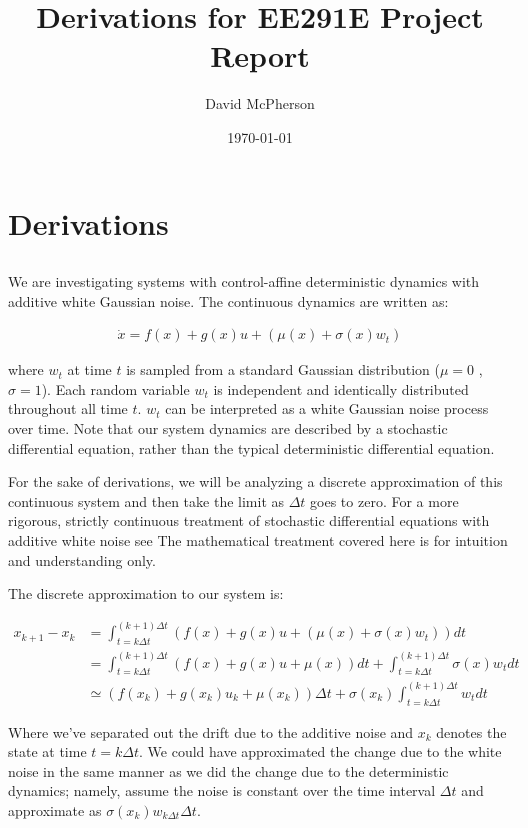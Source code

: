 \documentclass[a4paper]{article}
\title{Derivations for EE291E Project Report}
\author{David McPherson}
\date{\today}
\begin{document}
\section{Derivations}
\subsection{}
We are investigating systems with control-affine deterministic dynamics with additive white Gaussian noise.
The continuous dynamics are written as:

\begin{align}
\dot{x} = f(x) + g(x) u + (\mu(x) + \sigma(x) w_t)
\end{align}

where $w_t$ at time $t$ is sampled from a standard Gaussian distribution ($\mu = 0$ , $\sigma = 1$).
Each random variable $w_t$ is independent and identically distributed throughout all time $t$.
$w_t$ can be interpreted as a white Gaussian noise process over time.
Note that our system dynamics are described by a stochastic differential equation, rather than the typical deterministic differential equation.

For the sake of derivations, we will be analyzing a discrete approximation of this continuous system and then take the limit as $\Delta t$ goes to zero.
For a more rigorous, strictly continuous treatment of stochastic differential equations with additive white noise see %
The mathematical treatment covered here is for intuition and understanding only.

The discrete approximation to our system is:

\begin{align}
x_{k+1} - x_k &= \int_{t = k \Delta t}^{(k+1) \Delta t} (f(x) + g(x) u + (\mu(x) + \sigma(x) w_t) )dt
  \\  &= \int_{t = k \Delta t}^{(k+1) \Delta t} (f(x) + g(x) u + \mu(x)) dt + \int_{t = k \Delta t}^{(k+1) \Delta t} \sigma(x) w_t dt
\\ &\simeq (f(x_k) + g(x_k) u_k + \mu(x_k)) \Delta t + \sigma(x_k) \int_{t = k \Delta t}^{(k+1) \Delta t} w_t dt
\end{align}

Where we've separated out the drift due to the additive noise and $x_k$ denotes the state at time $t = k \Delta t$.
We could have approximated the change due to the white noise in the same manner as we did the change due to the deterministic dynamics;
namely, assume the noise is constant over the time interval $\Delta t$ and approximate as $\sigma(x_k) w_{k \Delta t} \Delta t$.
\end{document}

